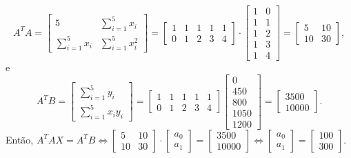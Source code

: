 \documentclass[12pt,a4paper]{article}
\begin{document}
\begin{ExerciseList}
\begin{enumerate}
\[
A^T A
= \begin{bmatrix}
 5                & \sum_{i=1}^5 x_i \\
\sum_{i=1}^5 x_i  & \sum_{i=1}^5 x_i^2
\end{bmatrix}
=\begin{bmatrix}
1 & 1 & 1 & 1 & 1 \\
0 & 1 & 2 & 3 & 4
\end{bmatrix}
\cdot
\begin{bmatrix}
  1 & 0 \\
  1 & 1 \\
  1 & 2 \\
  1 & 3 \\
  1 & 4
\end{bmatrix}
=\begin{bmatrix}
5 & 10 \\ 10 & 30
\end{bmatrix},
\]
e
\[
A^T B
= \begin{bmatrix}
 \sum_{i=1}^5 y_i \\
 \sum_{i=1}^5 x_i y_i
\end{bmatrix}
= \begin{bmatrix}
1 & 1 & 1 & 1 & 1 \\
0 & 1 & 2 & 3 & 4
\end{bmatrix}
\begin{bmatrix}
0 \\ 450 \\ 800 \\ 1050 \\ 1200
\end{bmatrix}
= \begin{bmatrix}
3500 \\ 10000
\end{bmatrix}.
\]
Então, 
$
A^T A X = A^T B
\Leftrightarrow
\begin{bmatrix}
5 & 10 \\ 10 & 30
\end{bmatrix}
\cdot
\begin{bmatrix}
a_0\\
a_1
\end{bmatrix}
=
\begin{bmatrix}
3500 \\ 10000
\end{bmatrix} 
\Leftrightarrow
\begin{bmatrix}
a_0\\
a_1
\end{bmatrix}
=
\begin{bmatrix}
100\\
300
\end{bmatrix}.
$


\end{enumerate}
\end{ExerciseList}
\end{document}
